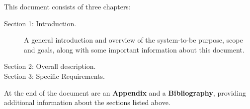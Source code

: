 This document consists of three chapters:

\begin{description}
\item[Section 1: Introduction.] A general introduction and overview of the system-to-be purpose, scope and goals, along with some important information about this document.
\item[Section 2: Overall description.]
\item[Section 3: Specific Requirements.]
\end{description}

At the end of the document are an \textbf{Appendix} and a \textbf{Bibliography}, providing additional information about the sections listed above.